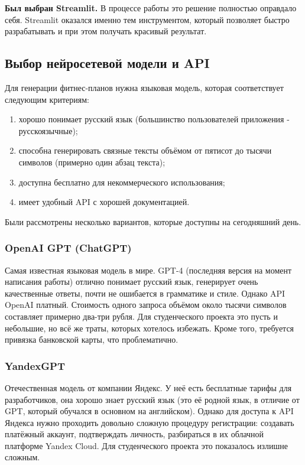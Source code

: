 \documentclass[14pt, a4paper]{extarticle}
\begin{document}
\begin{enumerate}
\medskip
\noindent \textbf{Был выбран Streamlit.} В процессе работы это решение полностью оправдало себя. Streamlit оказался именно тем инструментом, который позволяет быстро разрабатывать и при этом получать красивый результат.
\vskip 5cm
\subsection{Выбор нейросетевой модели и API}

\noindent Для генерации фитнес-планов нужна языковая модель, которая соответствует следующим критериям:

\begin{enumerate}
\item хорошо понимает русский язык (большинство пользователей приложения - русскоязычные);
\item способна генерировать связные тексты объёмом от пятисот до тысячи символов (примерно один абзац текста);
\item доступна бесплатно для некоммерческого использования;
\item имеет удобный API с хорошей документацией.
\end{enumerate}

\noindent Были рассмотрены несколько вариантов, которые доступны на сегодняшний день.

\subsubsection{OpenAI GPT (ChatGPT)}

\noindent Самая известная языковая модель в мире. GPT-4 (последняя версия на момент написания работы) отлично понимает русский язык, генерирует очень качественные ответы, почти не ошибается в грамматике и стиле. Однако API OpenAI платный. Стоимость одного запроса объёмом около тысячи символов составляет примерно два-три рубля. Для студенческого проекта это пусть и небольшие, но всё же траты, которых хотелось избежать. Кроме того, требуется привязка банковской карты, что проблематично.

\subsubsection{YandexGPT}

\noindent Отечественная модель от компании Яндекс. У неё есть бесплатные тарифы для разработчиков, она хорошо знает русский язык (это её родной язык, в отличие от GPT, который обучался в основном на английском). Однако для доступа к API Яндекса нужно проходить довольно сложную процедуру регистрации: создавать платёжный аккаунт, подтверждать личность, разбираться в их облачной платформе Yandex Cloud. Для студенческого проекта это показалось излишне сложным.


\end{enumerate}
\end{document}
